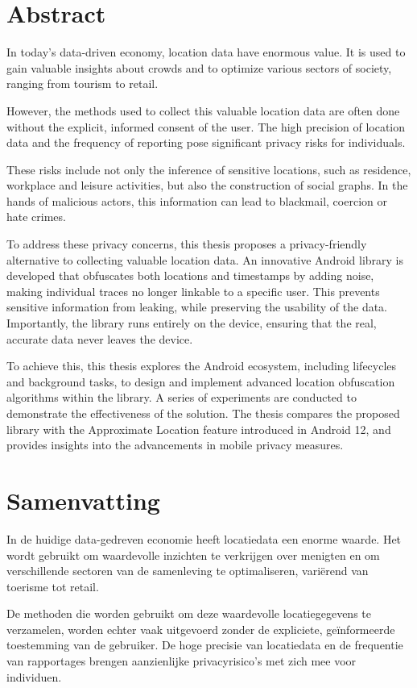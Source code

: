 \section{Abstract}
In today’s data-driven economy, location data have enormous value. It is used to gain valuable insights about crowds and to optimize various sectors of society, ranging from tourism to retail.

However, the methods used to collect this valuable location data are often done without the explicit, informed consent of the user. The high precision of location data and the frequency of reporting pose significant privacy risks for individuals.

These risks include not only the inference of sensitive locations, such as residence, workplace and leisure activities, but also the construction of social graphs. In the hands of malicious actors, this information can lead to blackmail, coercion or hate crimes.

To address these privacy concerns, this thesis proposes a privacy-friendly alternative to collecting valuable location data. An innovative Android library is developed that obfuscates both locations and timestamps by adding noise, making individual traces no longer linkable to a specific user. This prevents sensitive information from leaking, while preserving the usability of the data. Importantly, the library runs entirely on the device, ensuring that the real, accurate data never leaves the device.

To achieve this, this thesis explores the Android ecosystem, including lifecycles and background tasks, to design and implement advanced location obfuscation algorithms within the library.
A series of experiments are conducted to demonstrate the effectiveness of the solution. The thesis compares the proposed library with the Approximate Location feature introduced in Android 12, and provides insights into the advancements in mobile privacy measures.

\section{Samenvatting}
In de huidige data-gedreven economie heeft locatiedata een enorme waarde. Het wordt gebruikt om waardevolle inzichten te verkrijgen over menigten en om verschillende sectoren van de samenleving te optimaliseren, variërend van toerisme tot retail.

De methoden die worden gebruikt om deze waardevolle locatiegegevens te verzamelen, worden echter vaak uitgevoerd zonder de expliciete, geïnformeerde toestemming van de gebruiker. De hoge precisie van locatiedata en de frequentie van rapportages brengen aanzienlijke privacyrisico's met zich mee voor individuen.

